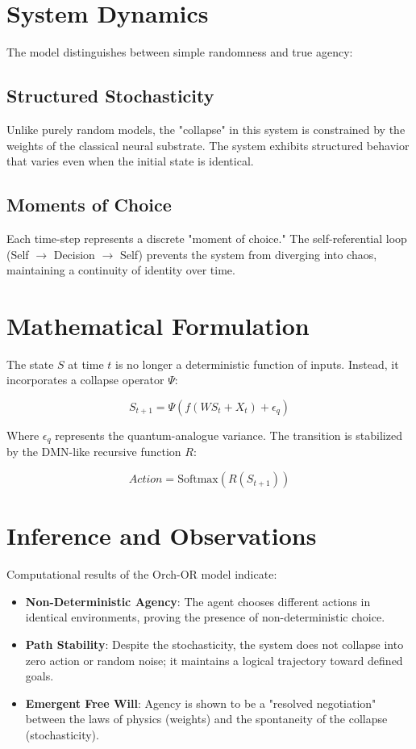 \documentclass[12pt]{article}
\begin{document}
\section{System Dynamics}

The model distinguishes between simple randomness and true agency:

\subsection{Structured Stochasticity}
Unlike purely random models, the "collapse" in this system is constrained by the weights of the classical neural substrate. The system exhibits structured behavior that varies even when the initial state is identical.

\subsection{Moments of Choice}
Each time-step represents a discrete "moment of choice." The self-referential loop (Self $\rightarrow$ Decision $\rightarrow$ Self) prevents the system from diverging into chaos, maintaining a continuity of identity over time.

\section{Mathematical Formulation}

The state $S$ at time $t$ is no longer a deterministic function of inputs. Instead, it incorporates a collapse operator $\Psi$:

\[
S_{t+1} = \Psi(f(W S_t + X_t) + \epsilon_{q})
\]

Where $\epsilon_{q}$ represents the quantum-analogue variance. The transition is stabilized by the DMN-like recursive function $R$:

\[
Action = \text{Softmax}(R(S_{t+1}))
\]

\section{Inference and Observations}

Computational results of the Orch-OR model indicate:
\begin{itemize}
\item \textbf{Non-Deterministic Agency}: The agent chooses different actions in identical environments, proving the presence of non-deterministic choice.
\item \textbf{Path Stability}: Despite the stochasticity, the system does not collapse into zero action or random noise; it maintains a logical trajectory toward defined goals.
\item \textbf{Emergent Free Will}: Agency is shown to be a "resolved negotiation" between the laws of physics (weights) and the spontaneity of the collapse (stochasticity).
\end{itemize}
\end{document}
